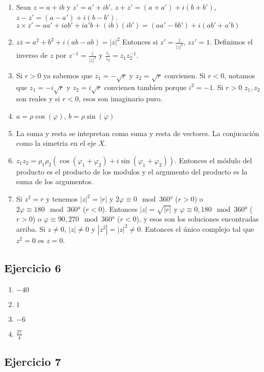 \begin{enumerate}
\item Sean $z = a+ib$ y $z' = a'+ib'$.
  $z + z' = {(a+a')} + i (b+b')$, $z - z' = {(a-a')} + i {(b-b')}$.
  $z \times z' = {a a'} + {i ab'} + {i a'b} + {(ib)(ib')} =
  {(aa' - bb')} + i {(ab' + a'b)}$
\item $z \bar{z} = a^2 + b^2 + i {(ab - ab)} = {|z|}^2$
  Entonces si $z' = \frac{\bar{z}}{{|z|}^2}$, $z z' = 1$. Definimos el inverso
  de $z$ por $z^{-1} = \frac{\bar{z}}{{|z|}^2}$ y
  $\frac{z_1}{z_2} = z_1 z_2^{-1}$.
\item Si $r > 0$ ya sabemos que $z_1 = -\sqrt{r}$ y $z_2 = \sqrt{r}$ convienen.
  Si $r < 0$, notamos que $z_1 = -i\sqrt{r}$ y $z_2 = i\sqrt{r}$ convienen
  tambíen porque $i^2 = -1$. Si $r > 0$ $z_1,z_2$ son reales y si $r < 0$,
  esos son imaginario puro.
\item $a = \rho {\cos(\varphi)}$, $b = \rho {\sin(\varphi)}$
\item La suma y resta se intepretan como suma y resta de vectores. La conjucación como la simetria en el eje $X$.
\item $z_1 z_2 = {\rho_1 \rho_2} \left({\cos(\varphi_1 + \varphi_2)} + i
  {\sin(\varphi_1 + \varphi_2)} \right)$. Entonces el módulo del producto es el
  producto de los modulos y el argumento del producto es la suma de los argumentos.
\item Si $z^2 = r$ y tenemos ${|z|}^2 = {|r|}$ y $2 \varphi \equiv 0 \mod 360°$ ($r > 0$) o $2 \varphi \equiv 180 \mod 360°$ ($r < 0$).
  Entonces $|z| = \sqrt{|r|}$ y $\varphi \equiv 0, 180 \mod 360°$ ($r > 0$)
  o $\varphi \equiv 90, 270 \mod 360°$ ($r < 0$), y esos son los soluciones
  encontradas arriba. Si $z \neq 0$, ${|z|} \neq 0$ y ${|z^2|} =
  {|z|}^2 \neq 0$. Entonces el único complejo tal que $z^2 = 0$ es $z = 0$.
\end{enumerate}

\subsection*{Ejercicio 6}

\begin{enumerate}
\item $-40$
\item $1$
\item $-6$
\item $\frac{27}{4}$
\end{enumerate}

\subsection*{Ejercicio 7}

